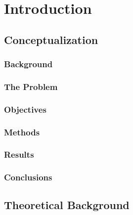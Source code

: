 \newcommand{\novathesis}{\emph{novathesis}}
\newcommand{\novathesisclass}{\texttt{novathesis.cls}}


\chapter{Introduction}
\label{cha:introduction}

\section{Conceptualization}%
\label{sec:contextualisation}

\subsection{Background}%
\label{sub:background}

\subsection{The Problem}%
\label{sub:the_problem}

\subsection{Objectives}%
\label{sub:objectives}

\subsection{Methods}%
\label{sub:methods}

\subsection{Results}%
\label{sub:results}

\subsection{Conclusions}%
\label{sub:conclusions}

\section{Theoretical Background}%
\label{sec:theoretical_background}

